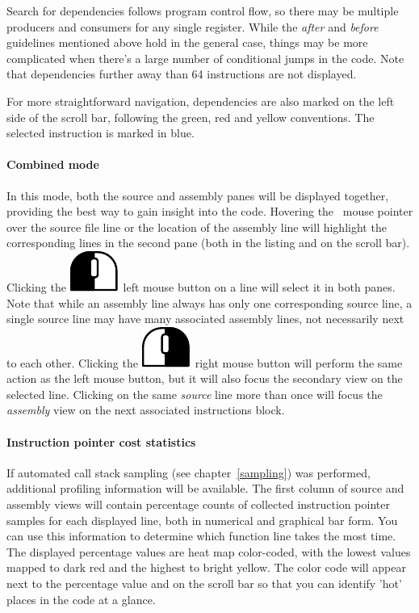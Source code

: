 \documentclass[hidelinks,titlepage,a4paper]{article}
\newcommand{\LMB}{\includegraphics[height=.8\baselineskip]{icons/lmb}}
\newcommand{\RMB}{\includegraphics[height=.8\baselineskip]{icons/rmb}}
\begin{document}
Search for dependencies follows program control flow, so there may be multiple producers and consumers for any single register. While the \emph{after} and \emph{before} guidelines mentioned above hold in the general case, things may be more complicated when there's a large number of conditional jumps in the code. Note that dependencies further away than 64 instructions are not displayed.

For more straightforward navigation, dependencies are also marked on the left side of the scroll bar, following the green, red and yellow conventions. The selected instruction is marked in blue.

\paragraph{Combined mode}

In this mode, both the source and assembly panes will be displayed together, providing the best way to gain insight into the code. Hovering the \faMousePointer{}~mouse pointer over the source file line or the location of the assembly line will highlight the corresponding lines in the second pane (both in the listing and on the scroll bar). Clicking the \LMB{}~left mouse button on a line will select it in both panes. Note that while an assembly line always has only one corresponding source line, a single source line may have many associated assembly lines, not necessarily next to each other. Clicking the \RMB{}~right mouse button will perform the same action as the left mouse button, but it will also focus the secondary view on the selected line. Clicking on the same \emph{source} line more than once will focus the \emph{assembly} view on the next associated instructions block.

\paragraph{Instruction pointer cost statistics}

If automated call stack sampling (see chapter~\ref{sampling}) was performed, additional profiling information will be available. The first column of source and assembly views will contain percentage counts of collected instruction pointer samples for each displayed line, both in numerical and graphical bar form. You can use this information to determine which function line takes the most time. The displayed percentage values are heat map color-coded, with the lowest values mapped to dark red and the highest to bright yellow. The color code will appear next to the percentage value and on the scroll bar so that you can identify 'hot' places in the code at a glance.
\end{document}
